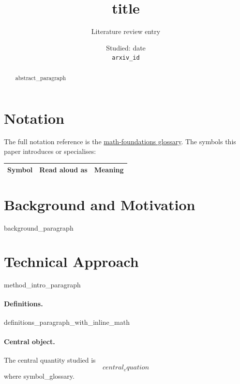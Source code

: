 \documentclass[11pt]{article}
\title{{{title}}}
\author{Literature review entry}
\date{Studied: {{date}} \\ \texttt{{{arxiv_id}}}}
\begin{document}
\maketitle

\begin{abstract}
{{abstract_paragraph}}
\end{abstract}

\section*{Notation}

The full notation reference is the
\href{https://github.com/pleyva2004/math-foundations/blob/main/notation.pdf}{math-foundations glossary}.
The symbols this paper introduces or specialises:

\begin{tabular}{lll}
\toprule
Symbol & Read aloud as & Meaning \\
\midrule
\bottomrule
\end{tabular}

\section{Background and Motivation}
{{background_paragraph}}

\section{Technical Approach}
\label{sec:method}

{{method_intro_paragraph}}

\paragraph{Definitions.}
{{definitions_paragraph_with_inline_math}}

\paragraph{Central object.}
The central quantity studied is
\begin{equation}
{{central_equation}}
\label{eq:central}
\end{equation}
where {{symbol_glossary}}.
\end{document}
